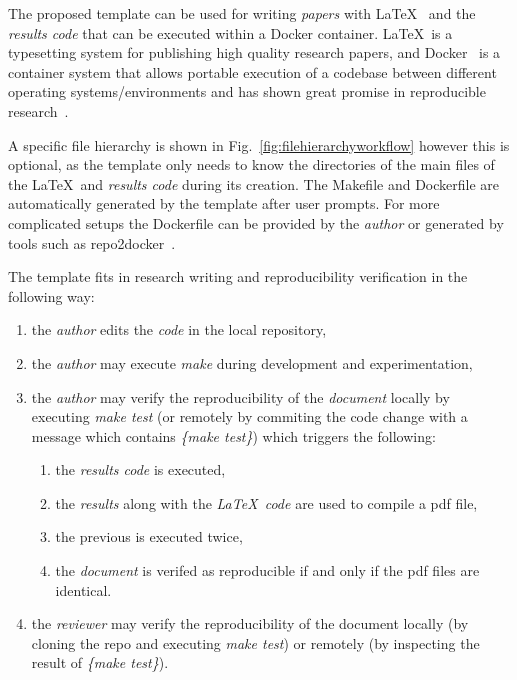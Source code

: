 \documentclass[journal]{IEEEtran}
\begin{document}
The proposed template can be used for writing \textit{papers} with \LaTeX~\cite{lamport1994latex} and the \textit{results code} that can be executed within a Docker container.
\LaTeX\ is a typesetting system for publishing high quality research papers, and Docker~\cite{merkel2014docker} is a container system that allows portable execution of a codebase between different operating systems/environments and has shown great promise in reproducible research~\cite{boettiger2015introduction}.

A specific file hierarchy is shown in Fig.~\ref{fig:filehierarchyworkflow} however this is optional, as the template only needs to know the directories of the main files of the \LaTeX\ and \textit{results code} during its creation.
The Makefile and Dockerfile are automatically generated by the template after user prompts.
For more complicated setups the Dockerfile can be provided by the \textit{author} or generated by tools such as repo2docker~\cite{forde2018reproducible}.

The template fits in research writing and reproducibility verification in the following way:
\begin{enumerate}
	\item the \textit{author} edits the \textit{code} in the local repository,
	\item the \textit{author} may execute \textit{make} during development and experimentation,
	\item the \textit{author} may verify the reproducibility of the \textit{document} locally by executing \textit{make test} (or remotely by commiting the code change with a message which contains \textit{\{make test\}}) which triggers the following:
		\begin{enumerate}
			\item the \textit{results code} is executed,
			\item the \textit{results} along with the \textit{\LaTeX\ code} are used to compile a pdf file,
			\item the previous is executed twice,
			\item the \textit{document} is verifed as reproducible if and only if the pdf files are identical.
		\end{enumerate}
	\item the \textit{reviewer} may verify the reproducibility of the document locally (by cloning the repo and executing \textit{make test}) or remotely (by inspecting the result of \textit{\{make test\}}).
\end{enumerate}
\end{document}
